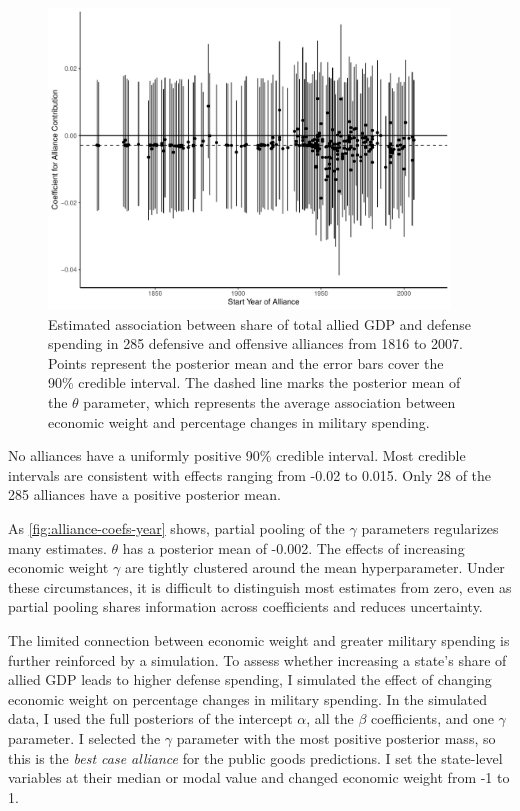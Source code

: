 \documentclass[12pt]{article}
\begin{document}
\begin{figure}[htbp]
	\centering
		\includegraphics[width=0.95\textwidth]{alliance-coefs-year.pdf}
	\caption{Estimated association between share of total allied GDP and defense spending in 285 defensive and offensive alliances from 1816 to 2007. Points represent the posterior mean and the error bars cover the 90\% credible interval. The dashed line marks the posterior mean of the $\theta$ parameter, which represents the average association between economic weight and percentage changes in military spending.}
	\label{fig:alliance-coefs-year}
\end{figure}


No alliances have a uniformly positive 90\% credible interval. 
Most credible intervals are consistent with effects ranging from -0.02 to 0.015. 
Only 28 of the 285 alliances have a positive posterior mean. 


As \autoref{fig:alliance-coefs-year} shows, partial pooling of the $\gamma$ parameters regularizes many estimates. 
$\theta$ has a posterior mean of -0.002. 
The effects of increasing economic weight $\gamma$ are tightly clustered around the mean hyperparameter. 
Under these circumstances, it is difficult to distinguish most estimates from zero, even as partial pooling shares information across coefficients and reduces uncertainty. 


The limited connection between economic weight and greater military spending is further reinforced by a simulation.
To assess whether increasing a state's share of allied GDP leads to higher defense spending, I simulated the effect of changing economic weight on percentage changes in military spending. 
In the simulated data, I used the full posteriors of the intercept $\alpha$, all the $\beta$ coefficients, and one $\gamma$ parameter. 
I selected the $\gamma$ parameter with the most positive posterior mass, so this is the \emph{best case alliance} for the public goods predictions. 
I set the state-level variables at their median or modal value and changed economic weight from -1 to 1. 
\end{document}
